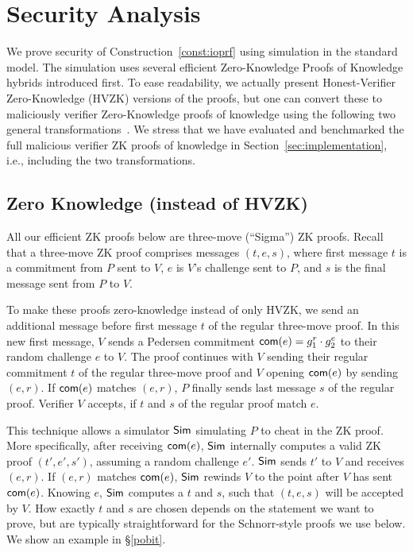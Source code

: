\section{Security Analysis}
\label{sec:sec-analysis}
We prove security of Construction~\ref{const:ioprf} using simulation
in the standard model. The simulation uses several efficient
Zero-Knowledge Proofs of Knowledge hybrids introduced first.  To ease
readability, we actually present Honest-Verifier Zero-Knowledge (HVZK)
versions of the proofs, but one can convert these to maliciously
verifier Zero-Knowledge proofs of knowledge using the following two
general transformations~\cite{efficient2pc}. We stress that we have
evaluated and benchmarked the full malicious verifier ZK proofs of
knowledge in Section~\ref{sec:implementation}, i.e., including the two
transformations.

\subsection{Zero Knowledge (instead of HVZK)}
\label{sec:extraction}
All our efficient ZK proofs below are three-move (``Sigma'') ZK
proofs. Recall that a three-move ZK proof comprises messages
$(t,e,s)$, where first message $t$ is a commitment from $P$ sent to
$V$, $e$ is $V$'s challenge sent to $P$, and $s$ is the final message
sent from $P$ to $V$.


To make these proofs zero-knowledge instead of only HVZK, we send an
additional message before first message $t$ of the regular three-move
proof.  In this new first message, $V$ sends a Pedersen commitment
$\mathsf{com}{}(e)=g_1^r\cdot{}g_2^e$ to their random challenge $e$ to
$V$. The proof  continues with $V$ sending their regular
commitment $t$ of the regular three-move proof and $V$ opening
$\mathsf{com}{}(e)$ by sending $(e,r)$. If $\mathsf{com}{}(e)$ matches
$(e,r)$, $P$ finally sends last message $s$ of the regular
proof. Verifier $V$ accepts, if $t$ and $s$ of the regular proof match
$e$.

This technique allows a simulator ${\mathsf{Sim}}$ simulating $P$ to cheat in
the ZK proof. More specifically, after receiving $\mathsf{com}{}(e)$, ${\mathsf{Sim}}$
internally computes a valid ZK proof $(t',e',s')$, assuming a random
challenge $e'$. ${\mathsf{Sim}}$ sends $t'$ to $V$ and receives $(e,r)$. If
$(e,r)$ matches $\mathsf{com}{}(e)$, ${\mathsf{Sim}}$ rewinds $V$ to the point after $V$
has sent $\mathsf{com}{}(e)$. Knowing $e$, ${\mathsf{Sim}}$ computes a $t$ and $s$, such
that $(t,e,s)$ will be accepted by $V$. How exactly $t$ and $s$ are
chosen depends on the statement we want to prove, but are typically
straightforward for the Schnorr-style proofs we use below. We show an
example in \S\ref{pobit}.


